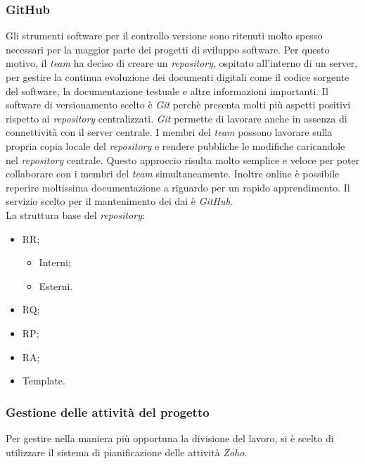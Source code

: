 \subsubsection{GitHub}
Gli strumenti software per il controllo versione sono ritenuti molto spesso necessari per la maggior parte dei progetti di sviluppo software.
Per questo motivo, il \textit{team} ha deciso di creare un \textit{repository}, ospitato all'interno di un server, per gestire la continua evoluzione dei documenti digitali come il codice sorgente del software, la documentazione testuale e altre informazioni importanti.
Il software di versionamento scelto è \textit{Git} perchè presenta molti più aspetti positivi rispetto ai \textit{repository} centralizzati. \textit{Git} permette di lavorare anche in assenza di connettività con il server centrale. I membri del \textit{team} possono lavorare sulla propria copia locale del \textit{repository} e rendere pubbliche le modifiche caricandole nel \textit{repository} centrale. Questo approccio risulta molto semplice e veloce per poter collaborare con i membri del \textit{team} simultaneamente.
Inoltre online è possibile reperire moltissima documentazione a riguardo per un rapido apprendimento. Il servizio scelto per il mantenimento dei dai è \textit{GitHub}. \\La struttura base del \textit{repository}:
\begin{itemize}
  \item
	RR;
	\begin{itemize}
		\item
			Interni;
		\item
			Esterni.
	\end{itemize}
  \item
    RQ;
  \item
    RP;
  \item
  	RA;
  \item
  	Template.
\end{itemize}

\subsubsection{Gestione delle attività del progetto}
Per gestire nella maniera più opportuna la divisione del lavoro, si è scelto di
utilizzare il sistema di pianificazione delle attività \textit{Zoho}.

